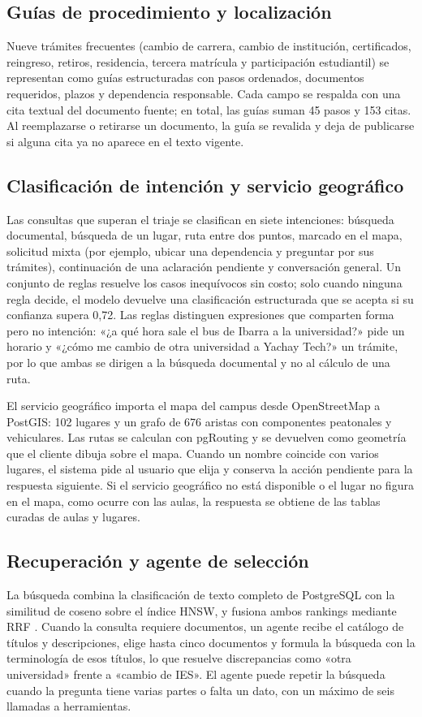 \documentclass[conference]{IEEEtran}
\begin{document}
\subsection{Guías de procedimiento y localización}
Nueve trámites frecuentes (cambio de carrera, cambio de institución, certificados, reingreso, retiros, residencia, tercera matrícula y participación estudiantil) se representan como guías estructuradas con pasos ordenados, documentos requeridos, plazos y dependencia responsable. Cada campo se respalda con una cita textual del documento fuente; en total, las guías suman 45 pasos y 153 citas. Al reemplazarse o retirarse un documento, la guía se revalida y deja de publicarse si alguna cita ya no aparece en el texto vigente.

\subsection{Clasificación de intención y servicio geográfico}
Las consultas que superan el triaje se clasifican en siete intenciones: búsqueda documental, búsqueda de un lugar, ruta entre dos puntos, marcado en el mapa, solicitud mixta (por ejemplo, ubicar una dependencia y preguntar por sus trámites), continuación de una aclaración pendiente y conversación general. Un conjunto de reglas resuelve los casos inequívocos sin costo; solo cuando ninguna regla decide, el modelo devuelve una clasificación estructurada que se acepta si su confianza supera 0,72. Las reglas distinguen expresiones que comparten forma pero no intención: «¿a qué hora sale el bus de Ibarra a la universidad?» pide un horario y «¿cómo me cambio de otra universidad a Yachay Tech?» un trámite, por lo que ambas se dirigen a la búsqueda documental y no al cálculo de una ruta.

El servicio geográfico importa el mapa del campus desde OpenStreetMap a PostGIS: 102 lugares y un grafo de 676 aristas con componentes peatonales y vehiculares. Las rutas se calculan con pgRouting y se devuelven como geometría que el cliente dibuja sobre el mapa. Cuando un nombre coincide con varios lugares, el sistema pide al usuario que elija y conserva la acción pendiente para la respuesta siguiente. Si el servicio geográfico no está disponible o el lugar no figura en el mapa, como ocurre con las aulas, la respuesta se obtiene de las tablas curadas de aulas y lugares.

\subsection{Recuperación y agente de selección}
La búsqueda combina la clasificación de texto completo de PostgreSQL con la similitud de coseno sobre el índice HNSW, y fusiona ambos rankings mediante RRF \cite{cormack2009rrf}. Cuando la consulta requiere documentos, un agente recibe el catálogo de títulos y descripciones, elige hasta cinco documentos y formula la búsqueda con la terminología de esos títulos, lo que resuelve discrepancias como «otra universidad» frente a «cambio de IES». El agente puede repetir la búsqueda cuando la pregunta tiene varias partes o falta un dato, con un máximo de seis llamadas a herramientas.
\end{document}
